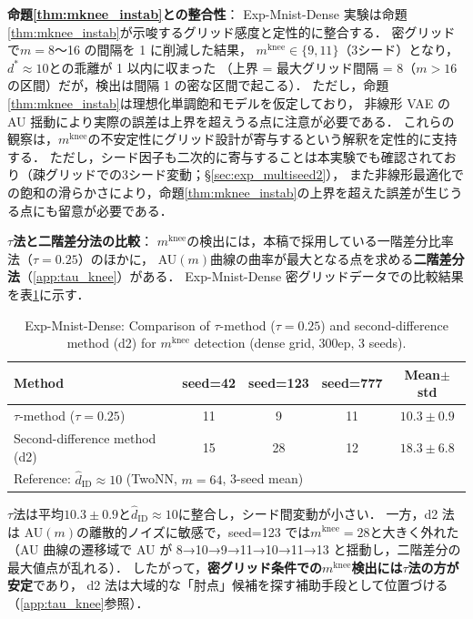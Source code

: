 \documentclass[11pt,a4paper]{jsarticle}
\newcommand{\mknee}{m^{\mathrm{knee}}}
\begin{document}
\noindent
\textbf{命題\ref{thm:mknee_instab}との整合性}：
Exp-Mnist-Dense 実験は命題\ref{thm:mknee_instab}が示唆するグリッド感度と定性的に整合する．
密グリッドで$m = 8$〜16 の間隔を 1 に削減した結果，
$\mknee \in \{9, 11\}$（3シード）となり，$d^* \approx 10$との乖離が 1 以内に収まった
（上界 = 最大グリッド間隔 = 8（$m > 16$の区間）だが，検出は間隔 1 の密な区間で起こる）．
ただし，命題\ref{thm:mknee_instab}は理想化単調飽和モデルを仮定しており，
非線形 VAE の AU 揺動により実際の誤差は上界を超えうる点に注意が必要である．
これらの観察は，$\mknee$の不安定性にグリッド設計が寄与するという解釈を定性的に支持する．
ただし，シード因子も二次的に寄与することは本実験でも確認されており（疎グリッドでの3シード変動；§\ref{sec:exp_multiseed2}），
また非線形最適化での飽和の滑らかさにより，命題\ref{thm:mknee_instab}の上界を超えた誤差が生じうる点にも留意が必要である．

\noindent
\textbf{$\tau$法と二階差分法の比較}：
$\mknee$の検出には，本稿で採用している一階差分比率法（$\tau = 0.25$）のほかに，
AU$(m)$曲線の曲率が最大となる点を求める\textbf{二階差分法}（\ref{app:tau_knee}）がある．
Exp-Mnist-Dense 密グリッドデータでの比較結果を表\ref{tab:el_knee_compare}に示す．

\begin{table}[H]
\centering
\caption{Exp-Mnist-Dense: Comparison of $\tau$-method ($\tau=0.25$) and second-difference method (d2) for $\mknee$ detection (dense grid, 300ep, 3 seeds).}
\label{tab:el_knee_compare}
\small
\begin{tabular}{lcccc}
\toprule
Method & seed=42 & seed=123 & seed=777 & Mean$\pm$std \\
\midrule
$\tau$-method ($\tau=0.25$) & 11 & 9  & 11 & $10.3 \pm 0.9$ \\
Second-difference method (d2) & 15 & 28 & 12 & $18.3 \pm 6.8$ \\
\midrule
\multicolumn{5}{l}{Reference: $\hat{d}_\mathrm{ID} \approx 10$ (TwoNN, $m=64$, 3-seed mean)} \\
\bottomrule
\end{tabular}
\end{table}

$\tau$法は平均$10.3 \pm 0.9$と$\hat{d}_\mathrm{ID} \approx 10$に整合し，シード間変動が小さい．
一方，d2 法は AU$(m)$の離散的ノイズに敏感で，seed=123 では$\mknee = 28$と大きく外れた
（AU 曲線の遷移域で AU が 8→10→9→11→10→11→13 と揺動し，二階差分の最大値点が乱れる）．
したがって，\textbf{密グリッド条件での$\mknee$検出には$\tau$法の方が安定}であり，
d2 法は大域的な「肘点」候補を探す補助手段として位置づける（\ref{app:tau_knee}参照）．
\end{document}
